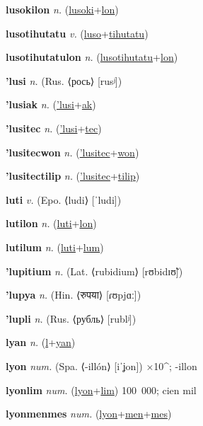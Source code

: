 \textbf{\hypertarget{lusokilon}{lusokilon}} \textit{n.} (\hyperlink{lusoki}{lusoki}+\allowbreak \hyperlink{lon}{lon})


\textbf{\hypertarget{lusotihutatu}{lusotihutatu}} \textit{v.} (\hyperlink{luso}{luso}+\allowbreak \hyperlink{tihutatu}{tihutatu})


\textbf{\hypertarget{lusotihutatulon}{lusotihutatulon}} \textit{n.} (\hyperlink{lusotihutatu}{lusotihutatu}+\allowbreak \hyperlink{lon}{lon})


\textbf{\hypertarget{'lusi}{'lusi}} \textit{n.} (Rus. ⟨рось⟩ [rusʲ])


\textbf{\hypertarget{'lusiak}{'lusiak}} \textit{n.} (\hyperlink{'lusi}{'lusi}+\allowbreak \hyperlink{ak}{ak})


\textbf{\hypertarget{'lusitec}{'lusitec}} \textit{n.} (\hyperlink{'lusi}{'lusi}+\allowbreak \hyperlink{tec}{tec})


\textbf{\hypertarget{'lusitecwon}{'lusitecwon}} \textit{n.} (\hyperlink{'lusitec}{'lusitec}+\allowbreak \hyperlink{won}{won})


\textbf{\hypertarget{'lusitectilip}{'lusitectilip}} \textit{n.} (\hyperlink{'lusitec}{'lusitec}+\allowbreak \hyperlink{tilip}{tilip})


\textbf{\hypertarget{luti}{luti}} \textit{v.} (Epo. ⟨ludi⟩ [ˈludi])


\textbf{\hypertarget{lutilon}{lutilon}} \textit{n.} (\hyperlink{luti}{luti}+\allowbreak \hyperlink{lon}{lon})


\textbf{\hypertarget{lutilum}{lutilum}} \textit{n.} (\hyperlink{luti}{luti}+\allowbreak \hyperlink{lum}{lum})


\textbf{\hypertarget{'lupitium}{'lupitium}} \textit{n.} (Lat. ⟨rubidium⟩ [rʊbidɪʊ̃])


\textbf{\hypertarget{'lupya}{'lupya}} \textit{n.} (Hin. ⟨{\devanagari{}रुपया}⟩ [ɾʊpjɑː])


\textbf{\hypertarget{'lupli}{'lupli}} \textit{n.} (Rus. ⟨рубль⟩ [rublʲ])


\textbf{\hypertarget{lyan}{lyan}} \textit{n.} (\hyperlink{l}{l}+\allowbreak \hyperlink{yan}{yan})


\textbf{\hypertarget{lyon}{lyon}} \textit{num.} (Spa. ⟨-illón⟩ [iˈʝon])
×10\textasciicircum{}; -illon

\textbf{\hypertarget{lyonlim}{lyonlim}} \textit{num.} (\hyperlink{lyon}{lyon}+\allowbreak \hyperlink{lim}{lim})
100~000; cien mil

\textbf{\hypertarget{lyonmenmes}{lyonmenmes}} \textit{num.} (\hyperlink{lyon}{lyon}+\allowbreak \hyperlink{men}{men}+\allowbreak \hyperlink{mes}{mes})


